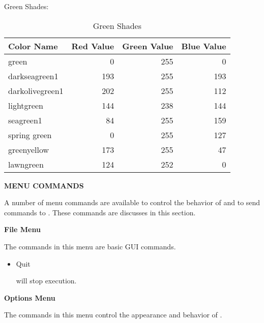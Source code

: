Green Shades:

\begin{table}[ht]
\begin{center}
\begin{tabular}{|l|r|r|r|}
\hline
{\bf Color Name} & {\bf Red Value} & {\bf Green Value} & {\bf Blue Value} \\
\hline
green           &   0 & 255 &   0 \\
darkseagreen1   & 193 & 255 & 193 \\
darkolivegreen1 & 202 & 255 & 112 \\
lightgreen      & 144 & 238 & 144 \\
seagreen1       &  84 & 255 & 159 \\
spring green    &   0 & 255 & 127 \\
greenyellow     & 173 & 255 &  47 \\
lawngreen       & 124 & 252 &   0 \\
\hline
\end{tabular}
\caption{Green Shades}
\end{center}
\end{table}

{\bf MENU COMMANDS}

A number of menu commands are available to control the behavior of
 and to send commands to .  These
commands are discusses in this section.

{\bf File Menu}

The commands in this menu are basic GUI commands.

\begin{itemize}

\item Quit\verb" "

 will stop execution.

\end{itemize}

{\bf Options Menu}

The commands in this menu control the appearance and behavior of
.

